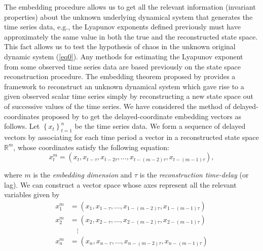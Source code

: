 The embedding procedure allows us to get all the relevant information (invariant properties) about the unknown underlying dynamical system that generates the time series data, e.g., the Lyapunov exponents defined previously must have approximately the same value in both the true and the reconstructed state space. This fact allows us to test the hypothesis of chaos in the unknown original dynamic system (\ref{eq0}). Any methods for estimating the Lyapunov exponent from some observed time series data are based previously on the state space reconstruction procedure. The embedding theorem proposed by \cite{Takens1981} provides a framework to reconstruct an unknown dynamical system which gave rise to a given observed scalar time series simply by reconstructing a new state space out of successive values of the time series. We have considered the method of delayed-coordinates proposed by \cite{Ruelle1971} to get the delayed-coordinate embedding vectors as follows. Let $\left\{ {{x_t}} \right\}_{t = 1}^n$ be the time series data. We form a sequence of delayed vectors by associating for each time period a vector in a reconstructed state space ${\mathbb{R}^m}$, whose coordinates satisfy the following equation:
\begin{equation}
x_t^m = \left( {{x_t},{x_{t - \tau }},{x_{t - 2\tau }}, \ldots ,{x_{t - \left( {m - 2} \right)\tau }},{x_{t - \left( {m - 1} \right)\tau }}} \right),
\label{eq:22}
\end{equation}

\noindent where $m$ is the \textit{embedding dimension} and $\tau$ is the \textit{reconstruction time-delay} (or lag). 
\newpage
We can construct a vector space whose axes represent all the relevant variables given by
\begin{align*}
x_{{1}}^m &= \left( {{x_{{1}}},{x_{{1} - \tau }}, \ldots ,{x_{{1} - \left( {m - 2} \right)\tau }},{x_{{1} - \left( {m - 1} \right)\tau }}} \right)\\
x_{{2}}^m &= \left( {{x_{{2}}},{x_{{2} - \tau }}, \ldots ,{x_{{2} - \left( {m - 2} \right)\tau }},{x_{{2} - \left( {m - 1} \right)\tau }}} \right) \\
&\quad \vdots \\
x_{{n}}^m & = \left( {{x_{{n}}},{x_{{n} - \tau }}, \ldots ,{x_{{n} - \left( {m - 2} \right)\tau }},{x_{{n} - \left( {m - 1} \right)\tau }}} \right)
\end{align*}

